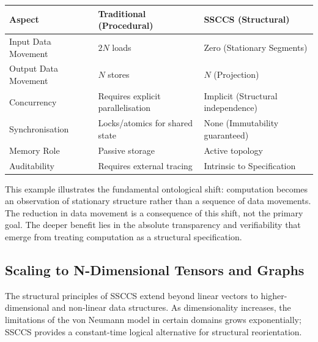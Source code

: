 \documentclass[
  a4paper,
  DIV=11,
  numbers=noendperiod]{scrartcl}
\begin{document}
\begin{longtable}[]{@{}
  >{\raggedright\arraybackslash}p{}
  >{\raggedright\arraybackslash}p{}
  >{\raggedright\arraybackslash}p{}@{}}
\toprule\noalign{}
\begin{minipage}[b]{\linewidth}\raggedright
Aspect
\end{minipage} & \begin{minipage}[b]{\linewidth}\raggedright
Traditional (Procedural)
\end{minipage} & \begin{minipage}[b]{\linewidth}\raggedright
SSCCS (Structural)
\end{minipage} \\
\midrule\noalign{}
\endhead
\bottomrule\noalign{}
\endlastfoot
Input Data Movement & \(2N\) loads & Zero (Stationary Segments) \\
Output Data Movement & \(N\) stores & \(N\) (Projection) \\
Concurrency & Requires explicit parallelisation & Implicit (Structural
independence) \\
Synchronisation & Locks/atomics for shared state & None (Immutability
guaranteed) \\
Memory Role & Passive storage & Active topology \\
Auditability & Requires external tracing & Intrinsic to Specification \\
\end{longtable}

This example illustrates the fundamental ontological shift: computation
becomes an observation of stationary structure rather than a sequence of
data movements. The reduction in data movement is a consequence of this
shift, not the primary goal. The deeper benefit lies in the absolute
transparency and verifiability that emerge from treating computation as
a structural specification.

\subsection{Scaling to N-Dimensional Tensors and
Graphs}\label{scaling-to-n-dimensional-tensors-and-graphs}

The structural principles of SSCCS extend beyond linear vectors to
higher-dimensional and non-linear data structures. As dimensionality
increases, the limitations of the von Neumann model in certain domains
grows exponentially; SSCCS provides a constant-time logical alternative
for structural reorientation.
\end{document}
